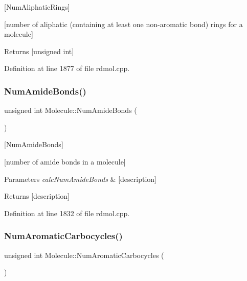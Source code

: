 \mbox{[}Num\+Aliphatic\+Rings\mbox{]} 

\mbox{[}number of aliphatic (containing at least one non-\/aromatic bond) rings for a molecule\mbox{]}

\begin{DoxyReturn}{Returns}
\mbox{[}unsigned int\mbox{]} 
\end{DoxyReturn}


Definition at line 1877 of file rdmol.\+cpp.

\mbox{\label{class_molecule_a48326bca7f346cee15f4c6f251ba8788}} 
\subsubsection{\texorpdfstring{Num\+Amide\+Bonds()}{NumAmideBonds()}}
{\footnotesize\ttfamily unsigned int Molecule\+::\+Num\+Amide\+Bonds (\begin{DoxyParamCaption}{ }\end{DoxyParamCaption})}



\mbox{[}Num\+Amide\+Bonds\mbox{]} 

\mbox{[}number of amide bonds in a molecule\mbox{]}


\begin{DoxyParams}{Parameters}
{\em calc\+Num\+Amide\+Bonds} & \mbox{[}description\mbox{]} \\
\hline
\end{DoxyParams}
\begin{DoxyReturn}{Returns}
\mbox{[}description\mbox{]} 
\end{DoxyReturn}


Definition at line 1832 of file rdmol.\+cpp.

\mbox{\label{class_molecule_af0be542ca2e2d7d137d80dc0fdc7d6ec}} 
\subsubsection{\texorpdfstring{Num\+Aromatic\+Carbocycles()}{NumAromaticCarbocycles()}}
{\footnotesize\ttfamily unsigned int Molecule\+::\+Num\+Aromatic\+Carbocycles (\begin{DoxyParamCaption}{ }\end{DoxyParamCaption})}



